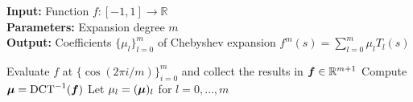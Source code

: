 \hspace*{\algorithmicindent} \textbf{Input:} Function $f:[-1, 1] \to \mathbb{R}$ \\%
\hspace*{\algorithmicindent} \textbf{Parameters:} Expansion degree $m$ \\
\hspace*{\algorithmicindent} \textbf{Output:} Coefficients $\{ \mu_l \}_{l=0}^m$ of Chebyshev expansion $f^m(s) = \sum_{l=0}^m \mu_l T_l(s)$
\begin{algorithmic}[1]
    \State Evaluate $f$ at $\{\cos(2\pi i / m)\}_{i=0}^m$ and collect the results in $\boldsymbol{f}\in \mathbb{R}^{m+1}$
    \State Compute $\boldsymbol{\mu} = \operatorname{DCT}^{-1}(\boldsymbol{f})$
    \State Let $\mu_l = (\boldsymbol{\mu})_l$ for $l=0,\dots,m$
\end{algorithmic}
